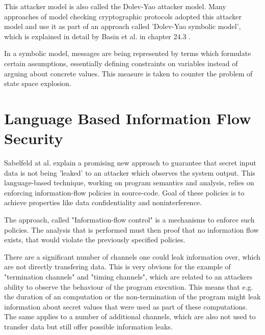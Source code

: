 \documentclass[a4paper,UKenglish]{lipics-v2018}
\begin{document}
This attacker model is also called the Dolev-Yao attacker model. Many approaches of model checking cryptographic protocols adopted this attacker model and use it as part of an approach called 'Dolev-Yao symbolic model', which is explained in detail by Basin et al. in chapter 24.3 \cite{model_checking_security_protocols}.

In a symbolic model, messages are being represented by terms which formulate certain assumptions, essentially defining constraints on variables instead of arguing about concrete values. This measure is taken to counter the problem of state space explosion.\cite{model_checking_security_protocols}




\newpage
\section{Language Based Information Flow Security}

Sabelfeld at al. explain a promising new approach to guarantee that secret input data is not being 'leaked' to an attacker which observes the system output. This language-based technique, working on program semantics and analysis, relies on enforcing information-flow policies in source-code. Goal of these policies is to achieve properties like data confidentiality and noninterference.\cite{language_based_information_flow_security}

The approach, called "Information-flow control" is a mechanisms to enforce such policies. The analysis that is performed must then proof that no information flow exists, that would violate the previously specified policies.\cite{language_based_information_flow_security}

There are a significant number of channels one could leak information over, which are not directly transfering data. This is very obvious for the example of "termination channels" and "timing channels", which are related to an attackers ability to observe the behaviour of the program execution. This means that e.g. the duration of an computation or the non-termination of the program might leak information about secret values that were used as part of these computations.
The same applies to a number of additional channels, which are also not used to transfer data but still offer possible information leaks.\cite{language_based_information_flow_security} %
\end{document}
